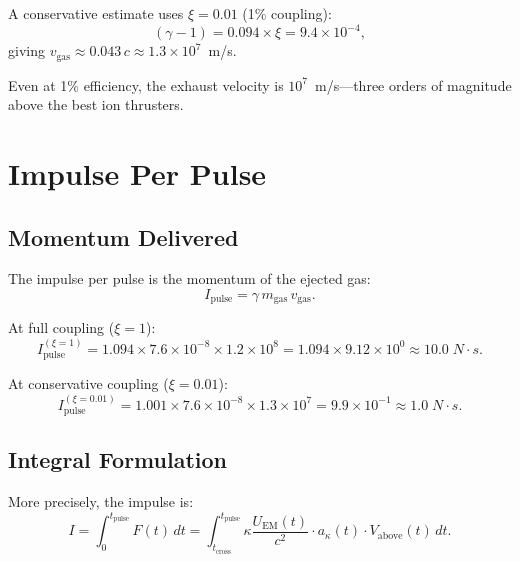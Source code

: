 \documentclass[amsmath,amssymb,aps,prd,superscriptaddress,nofootinbib]{revtex4-2}
\newcommand{\ka}{\kappa}
\begin{document}
A conservative estimate uses $\xi = 0.01$ (1\% coupling):
\begin{equation}
(\gamma - 1) = 0.094 \times \xi = 9.4 \times 10^{-4},
\end{equation}
giving $v_\text{gas} \approx 0.043\,c \approx 1.3 \times 10^7$~m/s.

Even at 1\% efficiency, the exhaust velocity is $10^7$~m/s---three
orders of magnitude above the best ion thrusters.

\section{Impulse Per Pulse}\label{sec:impulse}

\subsection{Momentum Delivered}

The impulse per pulse is the momentum of the ejected gas:
\begin{equation}
I_\text{pulse} = \gamma \, m_\text{gas} \, v_\text{gas}.
\end{equation}

At full coupling ($\xi = 1$):
\begin{equation}
I_\text{pulse}^{(\xi=1)} = 1.094 \times 7.6 \times 10^{-8} \times 1.2 \times 10^8
= 1.094 \times 9.12 \times 10^{0}
\approx 10.0 \; \si{N \cdot s}.
\end{equation}

At conservative coupling ($\xi = 0.01$):
\begin{equation}
I_\text{pulse}^{(\xi=0.01)} = 1.001 \times 7.6 \times 10^{-8} \times 1.3 \times 10^7
= 9.9 \times 10^{-1}
\approx 1.0 \; \si{N \cdot s}.
\end{equation}

\subsection{Integral Formulation}

More precisely, the impulse is:
\begin{equation}
I = \int_0^{t_\text{pulse}} F(t) \, dt
= \int_{t_\text{cross}}^{t_\text{pulse}} \ka \frac{U_\text{EM}(t)}{c^2} \cdot a_\kappa(t) \cdot V_\text{above}(t) \, dt.
\end{equation}
\end{document}
